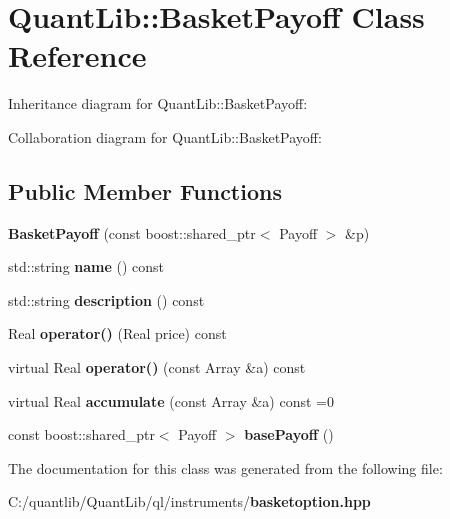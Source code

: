 \section{Quant\+Lib\+:\+:Basket\+Payoff Class Reference}
\label{class_quant_lib_1_1_basket_payoff}


Inheritance diagram for Quant\+Lib\+:\+:Basket\+Payoff\+:


Collaboration diagram for Quant\+Lib\+:\+:Basket\+Payoff\+:
\subsection*{Public Member Functions}
\begin{DoxyCompactItemize}
\item 
{\bfseries Basket\+Payoff} (const boost\+::shared\+\_\+ptr$<$ Payoff $>$ \&p)\label{class_quant_lib_1_1_basket_payoff_a72bc7a6cf7ba862cfeb15d4a951e39b3}

\item 
std\+::string {\bfseries name} () const \label{class_quant_lib_1_1_basket_payoff_a63ec582ba38e920cc603a76f6f944f29}

\item 
std\+::string {\bfseries description} () const \label{class_quant_lib_1_1_basket_payoff_adf5725fd25ae5507a6ffa39604c4b372}

\item 
Real {\bfseries operator()} (Real price) const \label{class_quant_lib_1_1_basket_payoff_a52ae4c35cc4a4437f18b53002b35164e}

\item 
virtual Real {\bfseries operator()} (const Array \&a) const \label{class_quant_lib_1_1_basket_payoff_a9750c689cda6e032a56d1928d721bda2}

\item 
virtual Real {\bfseries accumulate} (const Array \&a) const  =0\label{class_quant_lib_1_1_basket_payoff_a84c47609330a79d3a59e7ab08a6202cb}

\item 
const boost\+::shared\+\_\+ptr$<$ Payoff $>$ {\bfseries base\+Payoff} ()\label{class_quant_lib_1_1_basket_payoff_a6162621ebeaee4e1fb1aa7ac5ceb1b63}

\end{DoxyCompactItemize}


The documentation for this class was generated from the following file\+:\begin{DoxyCompactItemize}
\item 
C\+:/quantlib/\+Quant\+Lib/ql/instruments/{\bf basketoption.\+hpp}\end{DoxyCompactItemize}
